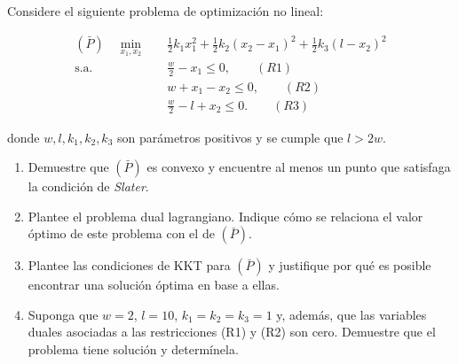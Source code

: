 Considere el siguiente problema de optimización no lineal:

\begin{equation*}
\begin{aligned}
    (\bar{P})\quad \min_{x_1,x_2} \quad 
    & \frac{1}{2}k_1x_1^2
    + \frac{1}{2}k_2(x_2-x_1)^2
    + \frac{1}{2}k_3(l-x_2)^2 \\
    \text{s.a.} \quad 
    & \frac{w}{2}-x_1 \leq 0, \qquad (R1) \\
    & w+x_1-x_2 \leq 0, \qquad (R2) \\
    & \frac{w}{2}-l+x_2 \leq 0. \qquad (R3)
\end{aligned}
\end{equation*}

donde $w,l,k_1,k_2,k_3$ son parámetros positivos y se cumple que $l>2w$.

\begin{enumerate}[label=(\alph*)]
    \item Demuestre que $(\bar{P})$ es convexo y encuentre al menos un punto que satisfaga la condición de \textit{Slater}.

    \item Plantee el problema dual lagrangiano. Indique cómo se relaciona el valor óptimo de este problema con el de $(\bar{P})$. 

    \item Plantee las condiciones de KKT para $(\bar{P})$ y justifique por qué es posible encontrar una solución óptima en base a ellas.

    \item Suponga que $w=2$, $l=10$, $k_1=k_2=k_3=1$ y, 
    además, que las variables duales asociadas a las restricciones (R1) y (R2) son cero. Demuestre que el problema tiene solución y determínela.
\end{enumerate}
